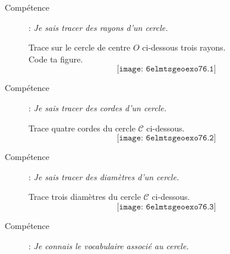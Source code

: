 \begin{multicols}{3}
  \begin{description}
    \item[Compétence ] : {\em Je sais tracer des rayons d'un cercle.}
\par Trace sur le cercle de centre $O$ ci-dessous trois rayons.
\\ Code ta figure.
\[\texttt{[image: 6elmtsgeoexo76.1]}\]
\par\columnbreak\par
\item[Compétence ] : {\em Je sais tracer des cordes d'un cercle.}
\par Trace quatre cordes du cercle $\mathscr C$ ci-dessous.
\[\texttt{[image: 6elmtsgeoexo76.2]}\]
\par\columnbreak\par
\item[Compétence ] : {\em Je sais tracer des diamètres d'un cercle.}
\par Trace trois diamètres du cercle $\mathscr C$ ci-dessous.
\[\texttt{[image: 6elmtsgeoexo76.3]}\]
\end{description}
  \end{multicols}
\begin{description}
\item[Compétence ] : {\em Je connais le vocabulaire associé au cercle.}
\end{description}